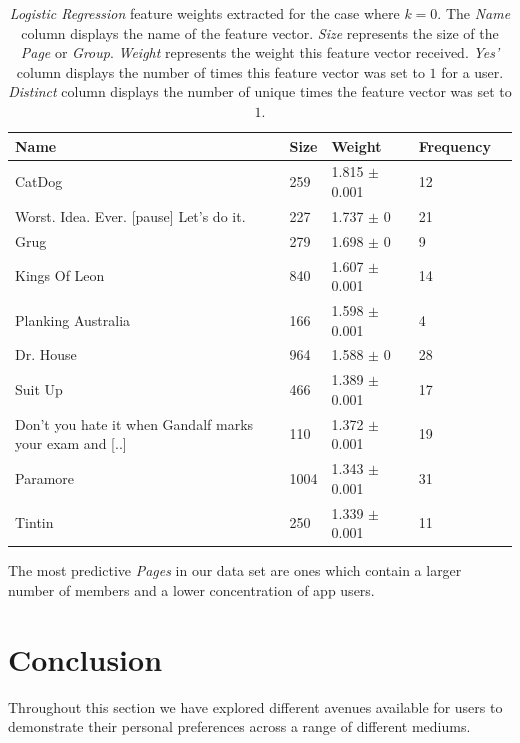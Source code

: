\begin{table}[h]
\begin{minipage}[b]{1.0\textwidth}
\centering
  \begin{tabular}{|l|l|l|l|l|} %
  \hline
  \textbf{Name} & \textbf{Size} & \textbf{Weight} & \textbf{Frequency} \\ \hline

CatDog  & 259 & 1.815 $\pm$ 0.001 & 12 \\ \hline
Worst. Idea. Ever. [pause] Let's do it.  & 227 & 1.737 $\pm$ 0 & 21 \\ \hline
Grug  & 279 & 1.698 $\pm$ 0 & 9 \\ \hline
Kings Of Leon  & 840 & 1.607 $\pm$ 0.001 & 14 \\ \hline
Planking Australia  & 166 & 1.598 $\pm$ 0.001 & 4 \\ \hline
Dr. House  & 964 & 1.588 $\pm$ 0 & 28 \\ \hline
Suit Up  & 466 & 1.389 $\pm$ 0.001 & 17 \\ \hline
Don't you hate it when Gandalf marks your exam and [..]  & 110 & 1.372 $\pm$ 0.001 & 19 \\ \hline
Paramore  & 1004 & 1.343 $\pm$ 0.001 & 31 \\ \hline
Tintin  & 250 & 1.339 $\pm$ 0.001 & 11 \\ \hline
  \end{tabular}
  \caption{\emph{Logistic Regression} feature weights extracted for the case where $k=0$. The \emph{Name} column displays the name of the feature vector.
                        \emph{Size} represents the size of the \emph{Page} or \emph{Group}.
                        \emph{Weight} represents the weight this feature vector received.  
                        \emph{Yes'} column displays the number of times this feature vector was set to $1$ for a user.
                        \emph{Distinct} column displays the number of unique times the feature vector was set to $1$.}
\end{minipage}
\end{table}

The most predictive \emph{Pages} in our data set are ones which contain a larger number of members and a lower concentration of 
app users.

\section{Conclusion}
\label{sec:conc}

Throughout this section we have explored different avenues available for users to demonstrate their personal preferences across a range of 
different mediums.

